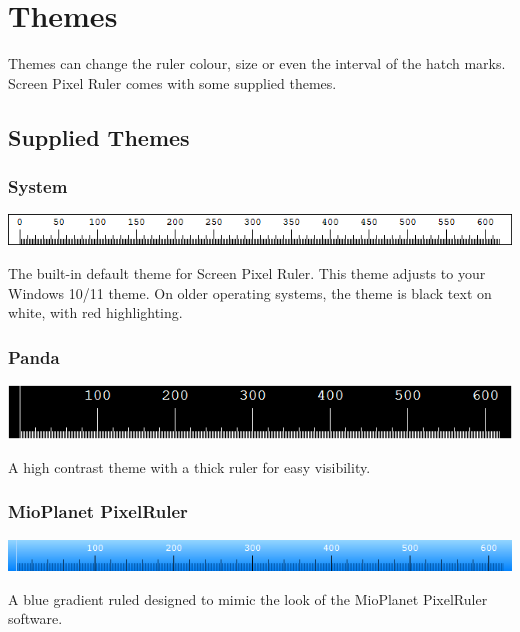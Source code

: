 \documentclass[
]{book}
\begin{document}
\chapter{Themes}\label{themes}

Themes can change the ruler colour, size or even the interval of the hatch marks.
Screen Pixel Ruler comes with some supplied themes.

\section{Supplied Themes}\label{supplied-themes}

\subsection{System}\label{system}

\includegraphics{images/theme-default.png}

The built-in default theme for Screen Pixel Ruler.
This theme adjusts to your Windows 10/11 theme.
On older operating systems, the theme is black text on white, with red highlighting.

\subsection{Panda}\label{panda}

\includegraphics{images/theme-panda.png}

A high contrast theme with a thick ruler for easy visibility.

\subsection{MioPlanet PixelRuler}\label{mioplanet-pixelruler}

\includegraphics{images/theme-mioplanet.png}

A blue gradient ruled designed to mimic the look of the MioPlanet PixelRuler software.
\end{document}

